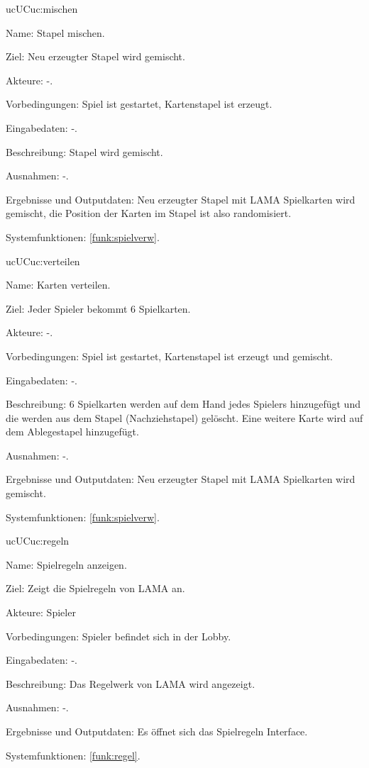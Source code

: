 \begin{description}[leftmargin=5em, style=sameline]
	\begin{lhp}{uc}{UC}{uc:mischen} %
		\item [Name:] Stapel mischen.
		\item [Ziel:] Neu erzeugter Stapel wird gemischt.
		\item [Akteure:] -.
		\item [Vorbedingungen:] Spiel ist gestartet, Kartenstapel ist erzeugt. 
		\item [Eingabedaten:]  -.
		\item [Beschreibung:] Stapel wird gemischt.
		\item [Ausnahmen:] -.
		\item [Ergebnisse und Outputdaten:] Neu erzeugter Stapel mit LAMA Spielkarten wird gemischt, die Position der Karten im Stapel ist also randomisiert.	
		\item [Systemfunktionen:] \ref{funk:spielverw}. %
	\end{lhp}
	
	\begin{lhp}{uc}{UC}{uc:verteilen} %
		\item [Name:] Karten verteilen.
		\item [Ziel:] Jeder Spieler bekommt 6 Spielkarten.
		\item [Akteure:] -.
		\item [Vorbedingungen:] Spiel ist gestartet, Kartenstapel ist erzeugt und gemischt. 
		\item [Eingabedaten:] -.
		\item [Beschreibung:] 6 Spielkarten werden auf dem Hand jedes Spielers hinzugefügt und die werden aus dem Stapel (Nachziehstapel) gelöscht. Eine weitere Karte wird auf dem Ablegestapel hinzugefügt.
		\item [Ausnahmen:] -.
		\item [Ergebnisse und Outputdaten:] Neu erzeugter Stapel mit LAMA Spielkarten wird gemischt.	
		\item [Systemfunktionen:] \ref{funk:spielverw}. %
	\end{lhp}
	
    \begin{lhp}{uc}{UC}{uc:regeln} %
		\item [Name:] Spielregeln anzeigen. 
		\item [Ziel:] Zeigt die Spielregeln von LAMA an.
		\item [Akteure:] Spieler 
		\item [Vorbedingungen:] Spieler befindet sich in der Lobby.
		\item [Eingabedaten:] -.
		\item [Beschreibung:] Das Regelwerk von LAMA wird angezeigt.
		\item [Ausnahmen:] -.
		\item [Ergebnisse und Outputdaten:] Es öffnet sich das Spielregeln Interface.
		\item [Systemfunktionen:] \ref{funk:regel}. 
	\end{lhp}	

	
	
	
	
	
	

\end{description}